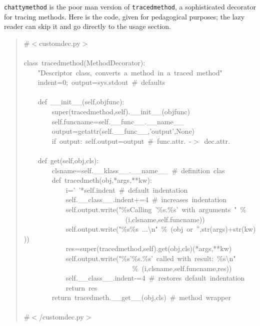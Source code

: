 \documentclass[11pt,english]{article}
\begin{document}
\texttt{chattymethod} is the poor man version of \texttt{tracedmethod}, a
sophisticated decorator for tracing methods.
Here is the code, given for pedagogical purposes; the lazy reader can 
skip it and go directly to the usage section.
\begin{quote}
\begin{ttfamily}\begin{flushleft}
\mbox{{\#}{$<$}customdec.py{$>$}}\\
\mbox{}\\
\mbox{class~tracedmethod(MethodDecorator):}\\
\mbox{~~~~"Descriptor~class,~converts~a~method~in~a~traced~method"}\\
\mbox{~~~~indent=0;~output=sys.stdout~{\#}~defaults}\\
\mbox{}\\
\mbox{~~~~def~{\_}{\_}init{\_}{\_}(self,objfunc):}\\
\mbox{~~~~~~~~super(tracedmethod,self).{\_}{\_}init{\_}{\_}(objfunc)}\\
\mbox{~~~~~~~~self.funcname=self.{\_}{\_}func{\_}{\_}.{\_}{\_}name{\_}{\_}}\\
\mbox{~~~~~~~~output=getattr(self.{\_}{\_}func{\_}{\_},'output',None)~}\\
\mbox{~~~~~~~~if~output:~self.output=output~{\#}~func.attr.~-{$>$}~dec.attr.}\\
\mbox{}\\
\mbox{~~~~def~get(self,obj,cls):}\\
\mbox{~~~~~~~~clsname=self.{\_}{\_}klass{\_}{\_}.{\_}{\_}name{\_}{\_}~{\#}~definition~clas}\\
\mbox{~~~~~~~~def~tracedmeth(obj,*args,**kw):}\\
\mbox{~~~~~~~~~~~~i='~'*self.indent~{\#}~default~indentation}\\
\mbox{~~~~~~~~~~~~self.{\_}{\_}class{\_}{\_}.indent+=4~{\#}~increases~indentation}\\
\mbox{~~~~~~~~~~~~self.output.write("{\%}sCalling~'{\%}s.{\%}s'~with~arguments~"~{\%}~}\\
\mbox{~~~~~~~~~~~~~~~~~~~~~~~~~~~~~(i,clsname,self.funcname))}\\
\mbox{~~~~~~~~~~~~self.output.write("{\%}s{\%}s~...{\textbackslash}n"~{\%}~(obj~or~'',str(args)+str(kw)))}\\
\mbox{~~~~~~~~~~~~res=super(tracedmethod,self).get(obj,cls)(*args,**kw)}\\
\mbox{~~~~~~~~~~~~self.output.write("{\%}s'{\%}s.{\%}s'~called~with~result:~{\%}s{\textbackslash}n"}\\
\mbox{~~~~~~~~~~~~~~~~~~~~~~~~~~~~~~~{\%}~(i,clsname,self.funcname,res))}\\
\mbox{~~~~~~~~~~~~self.{\_}{\_}class{\_}{\_}.indent-=4~{\#}~restores~default~indentation}\\
\mbox{~~~~~~~~~~~~return~res}\\
\mbox{~~~~~~~~return~tracedmeth.{\_}{\_}get{\_}{\_}(obj,cls)~{\#}~method~wrapper}\\
\mbox{}\\
\mbox{{\#}{$<$}/customdec.py{$>$}}
\end{flushleft}\end{ttfamily}
\end{quote}
\end{document}
